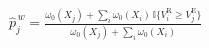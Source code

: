 \documentclass[border=8pt]{standalone}
\begin{document}
$\displaystyle \widehat p_j^{\,w}=\frac{\omega_0(X_j)+\sum_i \omega_0(X_i)\,\mathbb{I}\{V_i^{\mathrm{R}}\ge V_j^{\mathrm{E}}\}}{\omega_0(X_j)+\sum_i \omega_0(X_i)}$
\end{document}

